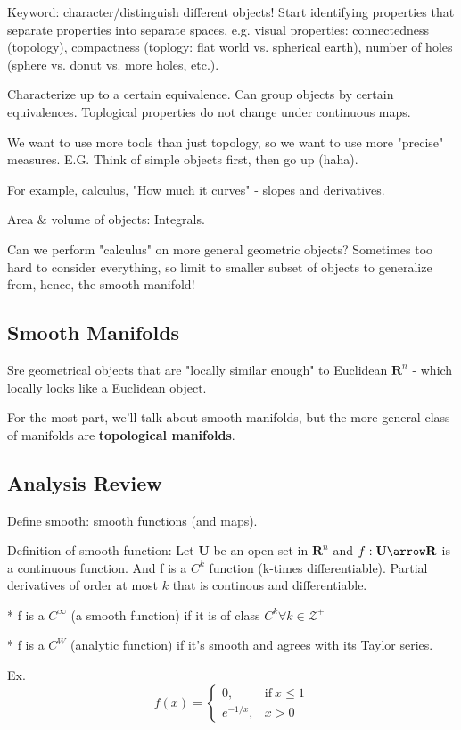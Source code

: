 \documentclass[12pt,letterpaper]{article}
\begin{document}
Keyword: character/distinguish different objects! Start identifying properties that separate properties into separate spaces, e.g. visual properties: connectedness (topology), compactness (toplogy: flat world vs. spherical earth), number of holes (sphere vs. donut vs. more holes, etc.). 

Characterize up to a certain equivalence. Can group objects by certain equivalences. Toplogical properties do not change under continuous maps. 

We want to use more tools than just topology, so we want to use more "precise" measures. E.G. Think of simple objects first, then go up (haha). 

For example, calculus, "How much it curves" - slopes and derivatives. 

Area & volume of objects: Integrals. 

Can we perform "calculus" on more general geometric objects? Sometimes too hard to  consider everything, so limit to smaller subset of objects to generalize from, hence, the smooth manifold!

\subsection{Smooth Manifolds}
Sre geometrical objects that are "locally similar enough" to Euclidean $\mathbf{R}^n$ - which locally looks like a Euclidean object. 

For the most part, we'll talk about smooth manifolds, but the more general class of manifolds are \textbf{topological manifolds}.

\subsection{Analysis Review}
Define smooth: smooth functions (and maps). 

Definition of smooth function: Let \textbf{U} be an open set in $\mathbf{R}^n$ and $f: \mathbf{U} \arrow \mathbf{R}$ is a continuous function. And f is a $C^k$ function (k-times differentiable). Partial derivatives of order at most $k$ that is continous and differentiable. 

* f is a $C^{\infty}$ (a smooth function) if it is of class $C^k \forall k \in \mathcal{Z}^+$

* f is a $C^W$ (analytic function) if it's smooth and agrees with its Taylor series.

Ex.
\begin{equation}
    f(x)=
    \begin{cases}
      0, & \text{if}\ x \leq 1 \\
      e^{-1/x}, & x >0
    \end{cases}
\end{equation}
\end{document}
